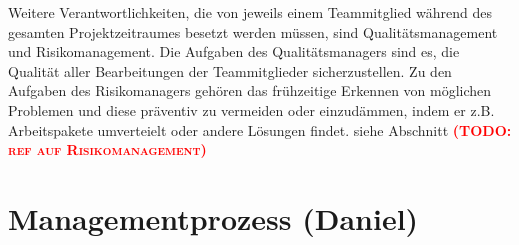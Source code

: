 \documentclass[fontsize=12pt,paper=a4,twoside]{scrartcl}
\newcommand{\todo}[1]{\textbf{\textsc{\textcolor{red}{(TODO: #1)}}}}
\begin{document}
Weitere Verantwortlichkeiten, die von jeweils einem Teammitglied während des gesamten Projektzeitraumes besetzt werden müssen, sind Qualitätsmanagement und Risikomanagement.
Die Aufgaben des Qualitätsmanagers sind es, die Qualität aller Bearbeitungen der Teammitglieder sicherzustellen.
Zu den Aufgaben des Risikomanagers gehören das frühzeitige Erkennen von möglichen Problemen und diese präventiv zu vermeiden oder einzudämmen, indem er z.B. Arbeitspakete umverteielt oder andere Lösungen findet. siehe Abschnitt \todo{ref auf Risikomanagement}


\section{Managementprozess (Daniel)}
\end{document}
